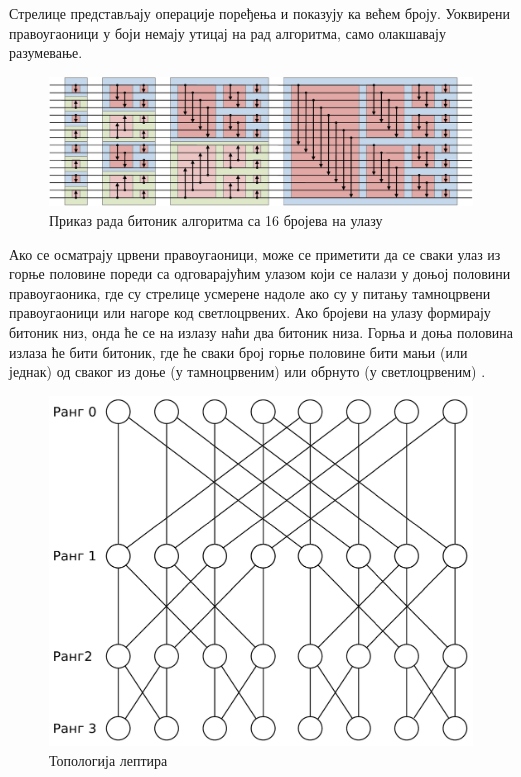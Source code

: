 \documentclass[12pt, a4paper]{article}
\theoremstyle{definition}
\begin{document}
Стрелице представљају операције поређења и показују ка већем броју. Уоквирени правоугаоници у боји немају утицај на рад алгоритма, само олакшавају разумевање.
\begin{figure}[H]
  \centering
      \includegraphics[scale=0.7]{slike/BitonicSort1.pdf}
  \caption{Приказ рада битоник алгоритма са 16 бројева на улазу}
  \label{fig:bitonicSortWiki}
\end{figure}
Ако се осматрају црвени правоугаоници, може се приметити да се сваки улаз из горње половине пореди са одговарајућим улазом који се налази у доњој половини правоугаоника, где су стрелице усмерене надоле ако су у питању тамноцрвени правоугаоници или нагоре код светлоцрвених.
%
Ако бројеви на улазу формирају битоник низ, онда ће се на излазу наћи два битоник низа. Горња и доња половина излаза ће бити битоник, где ће сваки број горње половине бити мањи (или једнак) од сваког из доње (у тамноцрвеним) или обрнуто (у светлоцрвеним) \cite{wiki_bitonic}.
%
\begin{figure}[H]
  \centering
      \includegraphics[scale=0.16]{slike/leptir}
  \caption{Топологија лептира}
  \label{fig:leptir}
\end{figure}
\end{document}
